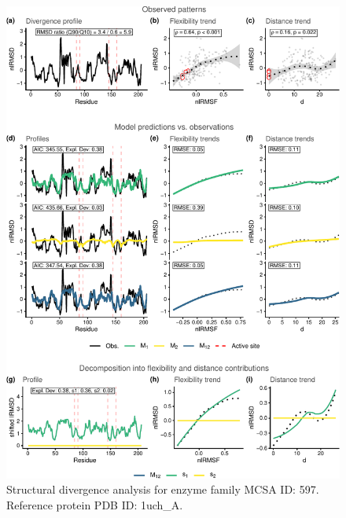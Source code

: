 \documentclass[
]{article}
\begin{document}
\clearpage
\begin{figure}[H]
\centering


\begin{center}\includegraphics{supplementary_material_files/figure-latex/generate_figures-25} \end{center}

\caption{Structural divergence analysis for enzyme family MCSA ID: 597. Reference protein PDB ID: 1uch\_A.}
\end{figure}
\end{document}
